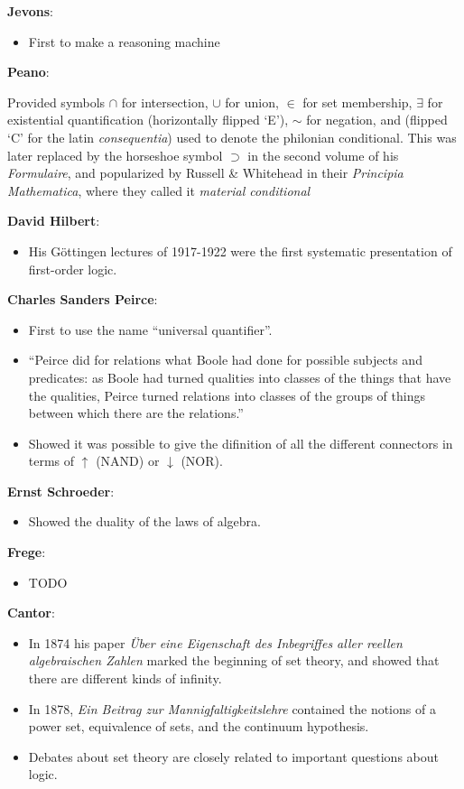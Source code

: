 \documentclass{article}
\begin{document}
\textbf{Jevons}:
\begin{itemize}
  \item First to make a reasoning machine

\end{itemize}

\textbf{Peano}:


Provided symbols \(\cap\) for intersection, \(\cup\) for union, \(\in\) for
set membership, \(\exists\) for existential quantification (horizontally
flipped `E'), \(\sim\) for negation, and  (flipped `C' for the latin
\textit{consequentia}) used to denote the philonian conditional. This was
later replaced by the horseshoe symbol \(\supset\) in the second volume of
his \textit{Formulaire}, and popularized by Russell \& Whitehead
in their \textit{Principia Mathematica}, where they called it \textit{material conditional}

\textbf{David Hilbert}:
\begin{itemize}
  \item His Göttingen lectures of 1917-1922 were the first systematic
  presentation of first-order logic.
\end{itemize}

\textbf{Charles Sanders Peirce}:
\begin{itemize}
  \item First to use the name ``universal quantifier''.
  \item ``Peirce did for relations what Boole had done for possible subjects
  and predicates: as Boole had turned qualities into classes of the things
  that have the qualities, Peirce turned relations into classes of the groups
  of things between which there are the relations.''
  \item Showed it was possible to give the difinition of all the different
  connectors in terms of \(\uparrow\) (NAND) or \(\downarrow\) (NOR).
\end{itemize}

\textbf{Ernst Schroeder}:
\begin{itemize}
  \item Showed the duality of the laws of algebra.
\end{itemize}

\textbf{Frege}:
\begin{itemize}
  \item TODO
\end{itemize}

\textbf{Cantor}:
\begin{itemize}
  \item In 1874 his paper \textit{Über eine Eigenschaft des Inbegriffes aller
  reellen algebraischen Zahlen} marked the beginning of set theory, and
  showed that there are different kinds of infinity.
  \item In 1878, \textit{Ein Beitrag zur Mannigfaltigkeitslehre} contained
  the notions of a power set, equivalence of sets, and the continuum
  hypothesis.
  \item Debates about set theory are closely related to important questions about logic.
\end{itemize}
\end{document}
